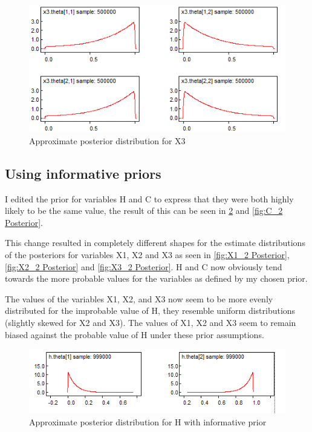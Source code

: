 \documentclass[12pt]{article} %
\begin{document}
\begin{figure}[h!]
  \centering
  \includegraphics[width=\linewidth]{bugs_graphs/x3.png}
  \caption{Approximate posterior distribution for X3}
  \label{fig:X3 Posterior}
\end{figure}

\clearpage

\subsection{Using informative priors}

I edited the prior for variables H and C to express that they were both highly likely to be the same value, the result of this can be seen in \cref{fig:H_2 Posterior} and \cref{fig:C_2 Posterior}.

This change resulted in completely different shapes for the estimate distributions of the posteriors for variables X1, X2 and X3 as seen in \cref{fig:X1_2 Posterior}, \cref{fig:X2_2 Posterior} and \cref{fig:X3_2 Posterior}. H and C now obviously tend towards the more probable values for the variables as defined by my chosen prior.

The values of the variables X1, X2, and X3 now seem to be more evenly distributed for the improbable value of H, they resemble uniform distributions (slightly skewed for X2 and X3). The values of X1, X2 and X3 seem to remain biased against the probable value of H under these prior assumptions.

\begin{figure}[h!]
  \centering
  \includegraphics[width=\linewidth]{bugs_graphs/h_2.png}
  \caption{Approximate posterior distribution for H with informative prior}
  \label{fig:H_2 Posterior}
\end{figure}
\end{document}
